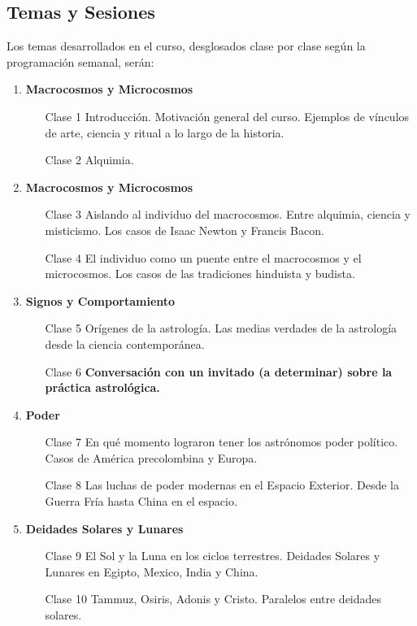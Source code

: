 \documentclass{report}
\begin{document}
\subsection*{Temas y Sesiones}

Los temas desarrollados en el curso, desglosados clase por clase seg\'un
la programaci\'on semanal, ser\'an:


\begin{enumerate}
\item {\bf Macrocosmos y Microcosmos}
\begin{itemize}
\item[Clase 1] Introducci\'on. Motivaci\'on general del
  curso. Ejemplos de v\'inculos de arte, ciencia y ritual a lo
  largo de la historia.
\item[Clase 2] Alquimia.
\end{itemize}

\item {\bf Macrocosmos y Microcosmos}
\begin{itemize}
\item[Clase 3]  Aislando al individuo del macrocosmos. Entre alquimia, ciencia y
  misticismo. Los casos de Isaac Newton y Francis Bacon.  
\item[Clase 4] El individuo como un puente entre el macrocosmos y el
  microcosmos. Los casos de las tradiciones hinduista y budista.
\end{itemize}

\item {\bf Signos y Comportamiento}
\begin{itemize}
\item[Clase 5] Or\'igenes de la astrolog\'ia. Las medias verdades de
  la astrolog\'ia desde la ciencia contempor\'anea. 
\item[Clase 6] {\bf Conversaci\'on con un invitado (a determinar) sobre
  la pr\'actica astrol\'ogica.} 
\end{itemize}

\item {\bf Poder}
\begin{itemize}
\item[Clase 7] En qu\'e momento lograron tener los astr\'onomos poder
  pol\'itico. Casos de Am\'erica precolombina y Europa.
\item[Clase 8] Las luchas de poder modernas en el Espacio
  Exterior. Desde la Guerra Fr\'ia hasta China en el espacio.
\end{itemize}

\item {\bf Deidades Solares y Lunares}
\begin{itemize}
\item[Clase 9] El Sol y la Luna en los ciclos terrestres. Deidades
  Solares y Lunares en Egipto, Mexico, India y China.
\item[Clase 10] Tammuz, Osiris, Adonis y Cristo. Paralelos entre
  deidades solares.
\end{itemize}


\end{enumerate}
\end{document}
